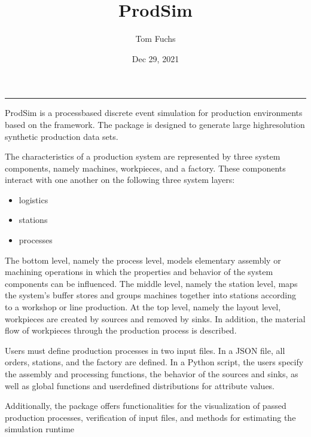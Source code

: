 \documentclass[letterpaper,10pt,english]{sphinxmanual}
\title{ProdSim}
\date{Dec 29, 2021}
\author{Tom Fuchs}
\begin{document}
\pagestyle{empty}
\sphinxmaketitle
\pagestyle{plain}
\sphinxtableofcontents
\pagestyle{normal}
\label{\detokenize{index::doc}}
\noindent{}


\bigskip\hrule\bigskip




\sphinxAtStartPar
ProdSim is a process\sphinxhyphen{}based discrete event simulation for production environments based on the
 framework. The package is designed to generate large high\sphinxhyphen{}resolution
synthetic production data sets.

\sphinxAtStartPar
The characteristics of a production system are represented by three system components, namely machines, workpieces, and
a factory. These components interact with one another on the following three system layers:
\begin{itemize}
\item {} 
\sphinxAtStartPar
logistics

\item {} 
\sphinxAtStartPar
stations

\item {} 
\sphinxAtStartPar
processes

\end{itemize}

\sphinxAtStartPar
The bottom level, namely the process level, models elementary assembly or machining operations in which the properties
and behavior of the system components can be influenced. The middle level, namely the station level, maps the system’s
buffer stores and groups machines together into stations according to a workshop or line production. At the top level,
namely the layout level, workpieces are created by sources and removed by sinks. In addition, the material flow of
workpieces through the production process is described.

\sphinxAtStartPar
Users must define production processes in two input files. In a JSON file, all orders, stations, and the factory are
defined. In a Python script, the users specify the assembly and processing functions, the behavior of the sources and
sinks, as well as global functions and user\sphinxhyphen{}defined distributions for attribute values.

\sphinxAtStartPar
Additionally, the package offers functionalities for the visualization of passed production processes, verification of
input files, and methods for estimating the simulation runtime
\end{document}
